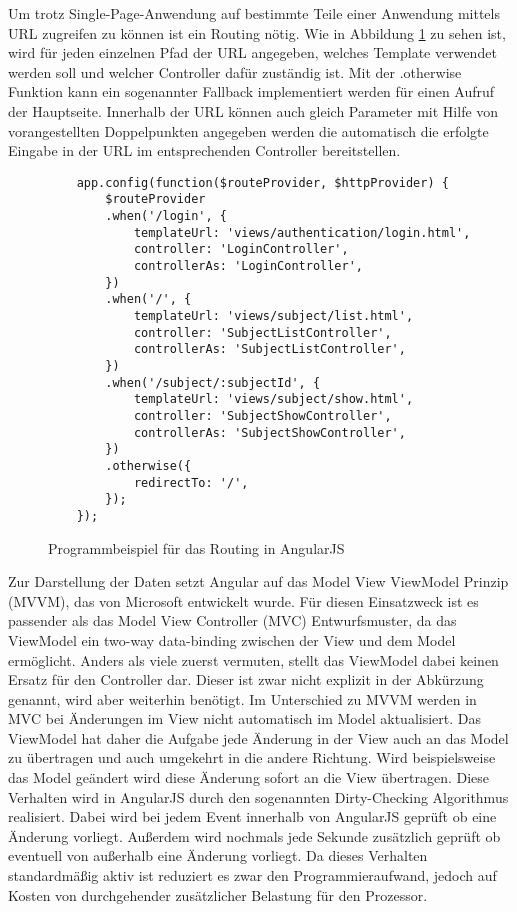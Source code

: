 Um trotz Single-Page-Anwendung auf bestimmte Teile einer Anwendung mittels URL zugreifen zu können ist ein Routing nötig.
Wie in Abbildung \ref{f:angularjs:routing} zu sehen ist, wird für jeden einzelnen Pfad der URL angegeben, welches Template verwendet werden soll und welcher Controller dafür zuständig ist.
Mit der .otherwise Funktion kann ein sogenannter Fallback implementiert werden für einen Aufruf der Hauptseite.
Innerhalb der URL können auch gleich Parameter mit Hilfe von vorangestellten Doppelpunkten angegeben werden die automatisch die erfolgte Eingabe in der URL im entsprechenden Controller bereitstellen.

\begin{figure}[t]
	\centering
	\begin{lstlisting}
	app.config(function($routeProvider, $httpProvider) {
		$routeProvider
		.when('/login', {
			templateUrl: 'views/authentication/login.html',
			controller: 'LoginController',
			controllerAs: 'LoginController',
		})
		.when('/', {
			templateUrl: 'views/subject/list.html',
			controller: 'SubjectListController',
			controllerAs: 'SubjectListController',
		})
		.when('/subject/:subjectId', {
			templateUrl: 'views/subject/show.html',
			controller: 'SubjectShowController',
			controllerAs: 'SubjectShowController',
		})
		.otherwise({
			redirectTo: '/',
		});		
	});
	\end{lstlisting}
	\caption{Programmbeispiel für das Routing in AngularJS}
	\label{f:angularjs:routing}
\end{figure}

Zur Darstellung der Daten setzt Angular auf das Model View ViewModel Prinzip (MVVM), das von Microsoft entwickelt wurde.
Für diesen Einsatzweck ist es passender als das Model View Controller (MVC) Entwurfsmuster, da das ViewModel ein two-way data-binding zwischen der View und dem Model ermöglicht.
Anders als viele zuerst vermuten, stellt das ViewModel dabei keinen Ersatz für den Controller dar.
Dieser ist zwar nicht explizit in der Abkürzung genannt, wird aber weiterhin benötigt.
Im Unterschied zu MVVM werden in MVC bei Änderungen im View nicht automatisch im Model aktualisiert.
Das ViewModel hat daher die Aufgabe jede Änderung in der View auch an das Model zu übertragen und auch umgekehrt in die andere Richtung.
Wird beispielsweise das Model geändert wird diese Änderung sofort an die View übertragen.
Diese Verhalten wird in AngularJS durch den sogenannten Dirty-Checking Algorithmus realisiert.
Dabei wird bei jedem Event innerhalb von AngularJS geprüft ob eine Änderung vorliegt.
Außerdem wird nochmals jede Sekunde zusätzlich geprüft ob eventuell von außerhalb eine Änderung vorliegt.
Da dieses Verhalten standardmäßig aktiv ist reduziert es zwar den Programmieraufwand, jedoch auf Kosten von durchgehender zusätzlicher Belastung für den Prozessor.

